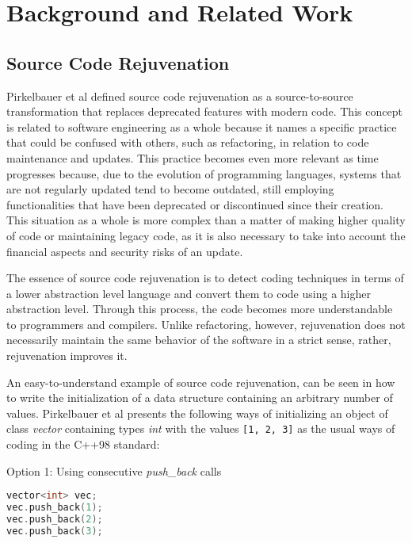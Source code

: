 
\section{Background and Related Work}

\subsection{Source Code Rejuvenation}
Pirkelbauer et al\cite{pirkelbauer2010source} defined source code rejuvenation as a source-to-source transformation that replaces deprecated features with modern code. This concept is related to software engineering as a whole because it names a specific practice that could be confused with others, such as refactoring, in relation to code maintenance and updates. This practice becomes even more relevant as time progresses because, due to the evolution of programming languages, systems that are not regularly updated tend to become outdated, still employing functionalities that have been deprecated or discontinued since their creation. This situation as a whole is more complex than a matter of making higher quality of code or maintaining legacy code, as it is also necessary to take into account the financial aspects and security risks of an update. \cite{sawant2018understanding}

The essence of source code rejuvenation is to detect coding techniques in terms of a lower abstraction level language and convert them to code using a higher abstraction level. Through this process, the code becomes more understandable to programmers and compilers. Unlike refactoring, however, rejuvenation does not necessarily maintain the same behavior of the software in a strict sense, rather, rejuvenation improves it.

An easy-to-understand example of source code rejuvenation, can be seen in how to write the initialization of a data structure containing an arbitrary number of values. Pirkelbauer et al\cite{pirkelbauer2010source} presents the following ways of initializing an object of class \textit{vector} containing types \textit{int} with the values \texttt{[1, 2, 3]} as the usual ways of coding in the C++98 standard:

Option 1: Using consecutive \textit{push\_back} calls

\begin{lstlisting}[language=C++]
vector<int> vec;
vec.push_back(1);
vec.push_back(2);
vec.push_back(3);
\end{lstlisting}


